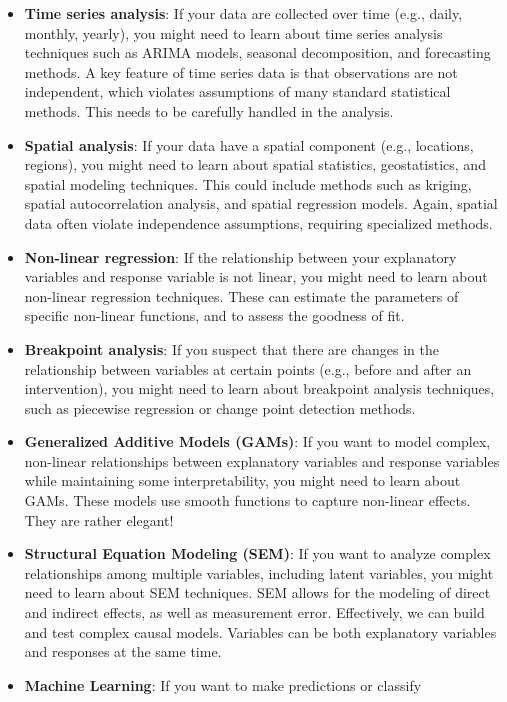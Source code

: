 \documentclass[
  letterpaper,
  8pt,
  a4paper]{book}
\begin{document}
\begin{itemize}
\item
  \textbf{Time series analysis}: If your data are collected over time
  (e.g., daily, monthly, yearly), you might need to learn about time
  series analysis techniques such as ARIMA models, seasonal
  decomposition, and forecasting methods. A key feature of time series
  data is that observations are not independent, which violates
  assumptions of many standard statistical methods. This needs to be
  carefully handled in the analysis.
\item
  \textbf{Spatial analysis}: If your data have a spatial component
  (e.g., locations, regions), you might need to learn about spatial
  statistics, geostatistics, and spatial modeling techniques. This could
  include methods such as kriging, spatial autocorrelation analysis, and
  spatial regression models. Again, spatial data often violate
  independence assumptions, requiring specialized methods.
\item
  \textbf{Non-linear regression}: If the relationship between your
  explanatory variables and response variable is not linear, you might
  need to learn about non-linear regression techniques. These can
  estimate the parameters of specific non-linear functions, and to
  assess the goodness of fit.
\item
  \textbf{Breakpoint analysis}: If you suspect that there are changes in
  the relationship between variables at certain points (e.g., before and
  after an intervention), you might need to learn about breakpoint
  analysis techniques, such as piecewise regression or change point
  detection methods.
\item
  \textbf{Generalized Additive Models (GAMs)}: If you want to model
  complex, non-linear relationships between explanatory variables and
  response variables while maintaining some interpretability, you might
  need to learn about GAMs. These models use smooth functions to capture
  non-linear effects. They are rather elegant!
\item
  \textbf{Structural Equation Modeling (SEM)}: If you want to analyze
  complex relationships among multiple variables, including latent
  variables, you might need to learn about SEM techniques. SEM allows
  for the modeling of direct and indirect effects, as well as
  measurement error. Effectively, we can build and test complex causal
  models. Variables can be both explanatory variables and responses at
  the same time.
\item
  \textbf{Machine Learning}: If you want to make predictions or classify

\end{itemize}
\end{document}
